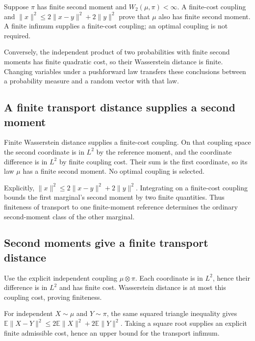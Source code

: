 \documentclass[11pt,a4paper]{report}
\begin{document}
Suppose \(\pi\) has finite second moment and \(W_2(\mu,\pi)<\infty\). A finite-cost coupling and \(\|x\|^2\le2\|x-y\|^2+2\|y\|^2\) prove that \(\mu\) also has finite second moment. A finite infimum supplies a finite-cost coupling; an optimal coupling is not required.



Conversely, the independent product of two probabilities with finite second moments has finite quadratic cost, so their Wasserstein distance is finite. Changing variables under a pushforward law transfers these conclusions between a probability measure and a random vector with that law.

\subsection{\texorpdfstring{A finite transport distance supplies a second moment}{A finite transport distance supplies a second moment}}
\label{report-step-UnadjustedLangevin-TransportMoments-lean-1}


Finite Wasserstein distance supplies a finite-cost coupling. On that coupling space the second coordinate is in \(L^2\) by the reference moment, and the coordinate difference is in \(L^2\) by finite coupling cost. Their sum is the first coordinate, so its law \(\mu\) has a finite second moment. No optimal coupling is selected.



Explicitly, \(\|x\|^2\le2\|x-y\|^2+2\|y\|^2\). Integrating on a finite-cost coupling bounds the first marginal's second moment by two finite quantities. Thus finiteness of transport to one finite-moment reference determines the ordinary second-moment class of the other marginal.

\subsection{\texorpdfstring{Second moments give a finite transport distance}{Second moments give a finite transport distance}}
\label{report-step-UnadjustedLangevin-TransportMoments-lean-2}


Use the explicit independent coupling \(\mu\otimes\pi\). Each coordinate is in \(L^2\), hence their difference is in \(L^2\) and has finite cost. Wasserstein distance is at most this coupling cost, proving finiteness.



For independent \(X\sim\mu\) and \(Y\sim\pi\), the same squared triangle inequality gives \(\mathbb E\|X-Y\|^2\le2\mathbb E\|X\|^2+2\mathbb E\|Y\|^2\). Taking a square root supplies an explicit finite admissible cost, hence an upper bound for the transport infimum.
\end{document}
